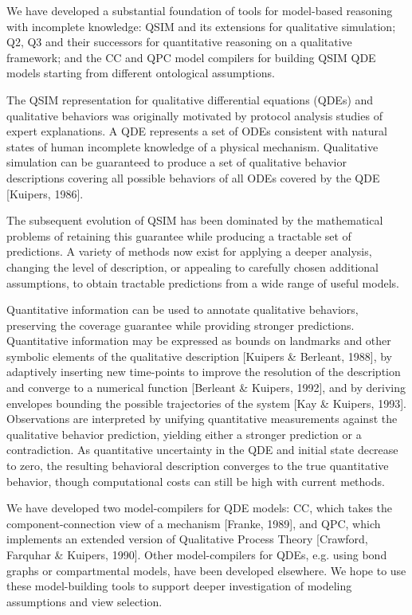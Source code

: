 We have developed a substantial foundation of tools for model-based
reasoning with incomplete knowledge:  QSIM and its extensions for
qualitative simulation; Q2, Q3 and their successors for quantitative
reasoning on a qualitative framework; and the CC and QPC model compilers
for building QSIM QDE models starting from different ontological
assumptions.

The QSIM representation for qualitative differential equations (QDEs)
and qualitative behaviors was originally motivated by protocol analysis
studies of expert explanations.  A QDE represents a set of ODEs
consistent with natural states of human incomplete knowledge of a
physical mechanism.  Qualitative simulation can be guaranteed to produce
a set of qualitative behavior descriptions covering all possible
behaviors of all ODEs covered by the QDE [Kuipers, 1986].

The subsequent evolution of QSIM has been dominated by the mathematical
problems of retaining this guarantee while producing a tractable set of
predictions.  A variety of methods now exist for applying a deeper
analysis, changing the level of description, or appealing to carefully
chosen additional assumptions, to obtain tractable predictions from a
wide range of useful models.

Quantitative information can be used to annotate qualitative behaviors,
preserving the coverage guarantee while providing stronger predictions.
Quantitative information may be expressed as bounds on landmarks and
other symbolic elements of the qualitative description [Kuipers \&
Berleant, 1988], by adaptively inserting new time-points to improve
the resolution of the description and converge to a numerical function
[Berleant \& Kuipers, 1992], and by deriving envelopes bounding the
possible trajectories of the system [Kay \& Kuipers, 1993].
Observations are interpreted by unifying quantitative measurements
against the qualitative behavior prediction, yielding either a stronger
prediction or a contradiction.  As quantitative uncertainty in the QDE
and initial state decrease to zero, the resulting behavioral description
converges to the true quantitative behavior, though computational costs
can still be high with current methods.

We have developed two model-compilers for QDE models: CC, which takes
the component-connection view of a mechanism [Franke, 1989], and QPC,
which implements an extended version of Qualitative Process Theory
[Crawford, Farquhar \& Kuipers, 1990].  Other model-compilers for
QDEs, e.g. using bond graphs or compartmental models, have been
developed elsewhere.  We hope to use these model-building tools to
support deeper investigation of modeling assumptions and view
selection.

